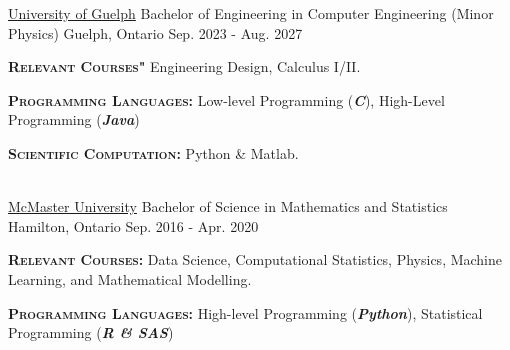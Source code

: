 


\begin{cventries}

\cventry
 {\href{https://www.uoguelph.ca/engineering/undergraduate/future-students/computer/}{University of Guelph}} %
    {Bachelor of Engineering in Computer Engineering (Minor Physics)} %
    {Guelph, Ontario} %
    {Sep. 2023 - Aug. 2027} %
       {
    \begin{cvitems} %
        \item{\textsc{\textbf{Relevant Courses"}} Engineering Design, Calculus I/II.}
        \item{\textsc{\textbf{Programming Languages:}} Low-level Programming (\textbf{\textit{C}}), High-Level Programming (\textbf{\textit{Java}})}
        \item{\textsc{\textbf{Scientific Computation:}} Python \& Matlab.}
    \end{cvitems}
    }\\ \vspace{0.15cm}
\cventry
{\href{https://www.math.mcmaster.ca/undergraduate/undergrad-welcome.html}{McMaster University}} %
    {Bachelor of Science in Mathematics and Statistics} %
    {Hamilton, Ontario} %
    {Sep. 2016 - Apr. 2020} %
    {
    \begin{cvitems} %
        \item{\textsc{\textbf{Relevant Courses:}} Data Science, Computational Statistics, Physics, Machine Learning, and Mathematical Modelling.}
        \item{\textsc{\textbf{Programming Languages:}} High-level Programming (\textbf{\textit{Python}}), Statistical Programming (\textbf{\textit{R \& SAS}})}
    \end{cvitems}
    }

\end{cventries}
